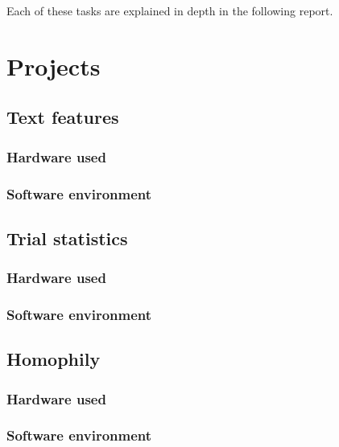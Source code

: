 \documentclass{report}
\begin{document}
Each of these tasks are explained in depth in the following report.

\chapter{Projects}
\section{Text features}

\subsection{Hardware used}

\subsection{Software environment}


\section{Trial statistics}

\subsection{Hardware used}

\subsection{Software environment}


\section{Homophily}

\subsection{Hardware used}

\subsection{Software environment}
\end{document}
